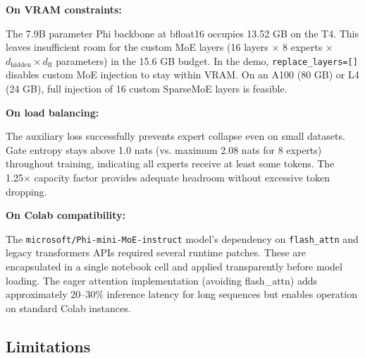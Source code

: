 \documentclass[11pt]{article}
\begin{document}
\textbf{On VRAM constraints:}

The 7.9B parameter Phi backbone at bfloat16 occupies 13.52 GB on the T4. This leaves insufficient room for the custom MoE layers (16 layers × 8 experts × $d_{\text{hidden}} \times d_{\text{ff}}$ parameters) in the 15.6 GB budget. In the demo, \texttt{replace\_layers=[]} disables custom MoE injection to stay within VRAM. On an A100 (80 GB) or L4 (24 GB), full injection of 16 custom SparseMoE layers is feasible.


\textbf{On load balancing:}

The auxiliary loss successfully prevents expert collapse even on small datasets. Gate entropy stays above 1.0 nats (vs. maximum 2.08 nats for 8 experts) throughout training, indicating all experts receive at least some tokens. The 1.25× capacity factor provides adequate headroom without excessive token dropping.


\textbf{On Colab compatibility:}

The \texttt{microsoft/Phi-mini-MoE-instruct} model's dependency on \texttt{flash\_attn} and legacy transformers APIs required several runtime patches. These are encapsulated in a single notebook cell and applied transparently before model loading. The eager attention implementation (avoiding flash\_attn) adds approximately 20–30\% inference latency for long sequences but enables operation on standard Colab instances.


\subsection{Limitations}
\end{document}
